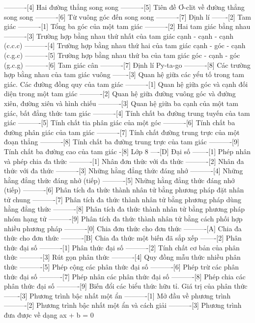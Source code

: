 ----------[4] Hai đường thẳng song song
----------[5] Tiên đề Ơ-clit về đường thẳng song song
----------[6] Từ vuông góc đến song song
----------[7] Định lí
-------[2] Tam giác
----------[1] Tổng ba góc của một tam giác
----------[2] Hai tam giác bằng nhau
----------[3] Trường hợp bằng nhau thứ nhất của tam giác cạnh - cạnh - cạnh (c.c.c)
----------[4] Trường hợp bằng nhau thứ hai của tam giác cạnh - góc - cạnh (c.g.c)
----------[5] Trường hợp bằng nhau thứ ba của tam giác góc - cạnh - góc (g.c.g)
----------[6] Tam giác cân
----------[7] Định lí Py-ta-go
----------[8] Các trường hợp bằng nhau của tam giác vuông
-------[3] Quan hệ giữa các yểu tố trong tam giác. Các đường đồng quy của tam giác
----------[1] Quan hệ giữa góc và cạnh đối diện trong một tam giác
----------[2] Quan hệ giữa đường vuông góc và đường xiên, đường xiên và hình chiếu
----------[3] Quan hệ giữa ba cạnh của một tam giác, bất đẳng thức tam giác
----------[4] Tính chất ba đường trung tuyến của tam giác
----------[5] Tính chất tia phân giác của một góc
----------[6] Tính chất ba đường phân giác của tam giác
----------[7] Tính chất đường trung trực của một đoạn thẳng
----------[8] Tính chất ba đường trung trực của tam giác
----------[9] Tính chất ba đường cao của tam giác
-[8] Lớp 8
----[D] Đại số
-------[1] Phép nhân và phép chia đa thức
----------[1] Nhân đơn thức với đa thức
----------[2] Nhân đa thức với đa thức
----------[3] Những hằng đẳng thức đáng nhớ
----------[4] Những hằng đẳng thức đáng nhớ (tiếp)
----------[5] Những hằng đẳng thức đáng nhớ (tiếp)
----------[6] Phân tích đa thức thành nhân tử bằng phương pháp đặt nhân tử chung
----------[7] Phân tích đa thức thành nhân tử bằng phương pháp dùng hằng đẳng thức
----------[8] Phân tích đa thức thành nhân tử bằng phương pháp nhóm hạng tử
----------[9] Phân tích đa thức thành nhân tử bằng cách phối hợp nhiều phương pháp
----------[0] Chia đơn thức cho đơn thức
----------[A] Chia đa thức cho đơn thức
----------[B] Chia đa thức một biến đã sắp xếp
-------[2] Phân thức đại số
----------[1] Phân thức đại số
----------[2] Tính chất cơ bản của phân thức
----------[3] Rút gọn phân thức
----------[4] Quy đồng mẫu thức nhiều phân thức
----------[5] Phép cộng các phân thức đại số
----------[6] Phép trừ các phân thức đại số
----------[7] Phép nhân các phân thức đại số
----------[8] Phép chia các phân thức đại số
----------[9] Biến đổi các biểu thức hữu tỉ. Giá trị của phân thức
-------[3] Phương trình bậc nhất một ẩn
----------[1] Mở đầu về phương trình
----------[2] Phương trình bậc nhất một ẩn và cách giải
----------[3] Phương trình đưa được về dạng ax + b = 0
